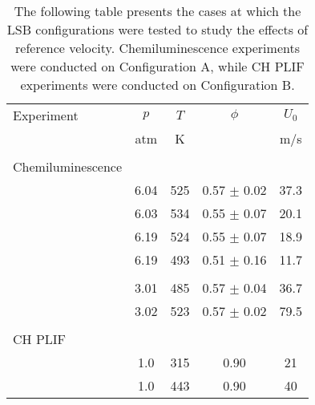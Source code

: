 \begin{table}
  \caption[Test conditions for studying reference velocity effects]{The following table presents the cases at which the LSB configurations were tested to study the effects of reference velocity. Chemiluminescence experiments were conducted on Configuration A, while CH PLIF experiments were conducted on Configuration B.}
  \begin{center}
    \begin{tabular}{lcccc}
      Experiment & \(p\) & \(T\) & \(\phi\) & \(U_0\) \tabularnewline
      & atm & K & & m/s \tabularnewline
      \hline\hline
      & & & & \tabularnewline
      Chemiluminescence & & & & \tabularnewline
      \hline
      & 6.04 & 525 & 0.57 \(\pm\) 0.02 & 37.3 \tabularnewline
      & 6.03 & 534 & 0.55 \(\pm\) 0.07 & 20.1 \tabularnewline
      & 6.19 & 524 & 0.55 \(\pm\) 0.07 & 18.9 \tabularnewline
      & 6.19 & 493 & 0.51 \(\pm\) 0.16 & 11.7 \tabularnewline
      & & & & \tabularnewline
      & 3.01 & 485 & 0.57 \(\pm\) 0.04 & 36.7 \tabularnewline
      & 3.02 & 523 & 0.57 \(\pm\) 0.02 & 79.5 \tabularnewline
      & & & & \tabularnewline
      CH PLIF & & & & \tabularnewline
      \hline
      & 1.0 & 315 & 0.90 & 21 \tabularnewline
      & 1.0 & 443 & 0.90 & 40 \tabularnewline
      \hline
    \end{tabular}
  \end{center}
  \label{tab:referenceVelocityCases}
\end{table}

